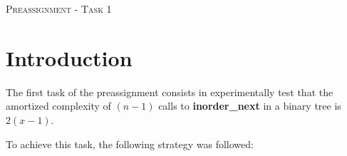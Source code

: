 \documentclass[12p]{article}
\begin{document}


  \newpage 				%



  \tableofcontents 			%



  \newpage 				%







\begin{center}

  \textsc{\LARGE Preassignment - Task 1}\\[1cm] %

\end{center}

 
  \section{Introduction}			%

  \large The first task of the preassignment consists in experimentally test that the amortized complexity of $(n-1)$ calls to \textbf {inorder\_next} in a binary tree is $2(x-1)$.

\bigskip

 \large To achieve this task, the following strategy was followed:
\end{document}
